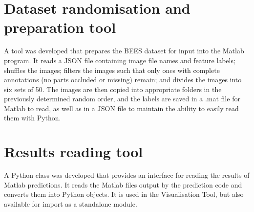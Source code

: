 \documentclass[11pt, oneside]{report}
\begin{document}
    \section{Dataset randomisation and preparation tool}
        A tool was developed that prepares the BEES dataset for input into the Matlab program. It reads a JSON file containing image file names and feature labels; shuffles the images; filters the images such that only ones with complete annotations (no parts occluded or missing) remain; and divides the images into six sets of 50. The images are then copied into appropriate folders in the previously determined random order, and the labels are saved in a .mat file for Matlab to read, as well as in a JSON file to maintain the ability to easily read them with Python.
    
    \section{Results reading tool}
        A Python class was developed that provides an interface for reading the results of Matlab predictions. It reads the Matlab files output by the prediction code and converts them into Python objects. It is used in the Visualisation Tool, but also available for import as a standalone module.
\end{document}
